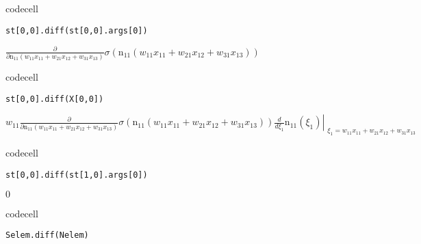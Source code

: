 codecell

\begin{verbatim}
st[0,0].diff(st[0,0].args[0])
\end{verbatim}

$\displaystyle \frac{\partial}{\partial \operatorname{n_{11}}{\left(w_{11} x_{11} + w_{21} x_{12} + w_{31} x_{13} \right)}} \sigma{\left(\operatorname{n_{11}}{\left(w_{11} x_{11} + w_{21} x_{12} + w_{31} x_{13} \right)} \right)}$

codecell

\begin{verbatim}
st[0,0].diff(X[0,0])
\end{verbatim}

$\displaystyle w_{11} \frac{\partial}{\partial \operatorname{n_{11}}{\left(w_{11} x_{11} + w_{21} x_{12} + w_{31} x_{13} \right)}} \sigma{\left(\operatorname{n_{11}}{\left(w_{11} x_{11} + w_{21} x_{12} + w_{31} x_{13} \right)} \right)} \left. \frac{d}{d \xi_{1}} \operatorname{n_{11}}{\left(\xi_{1} \right)} \right|_{\substack{ \xi_{1}=w_{11} x_{11} + w_{21} x_{12} + w_{31} x_{13} }}$

codecell

\begin{verbatim}
st[0,0].diff(st[1,0].args[0])
\end{verbatim}

$\displaystyle 0$

codecell

\begin{verbatim}
Selem.diff(Nelem)
\end{verbatim}

